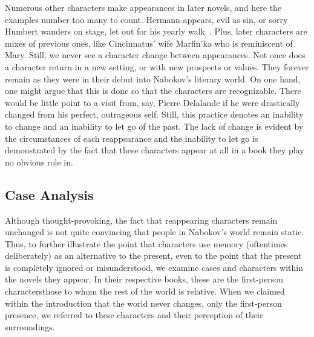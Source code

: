 Numerous other characters make appearances in later novels, and here the examples number too many to count. 
Hermann appears, evil as sin, or sorry Humbert wanders on stage, let out for his yearly walk~\cite[xiii]{nabokov1989despair}.
Plus, later characters are mixes of previous ones, like Cincinnatus' wife Marfin'ka who is reminiscent of Mary.
Still, we never see a character change between appearances. 
Not once does a character return in a new setting, or with new prospects or values.
They forever remain as they were in their debut into Nabokov's literary world.
On one hand, one might argue that this is done so that the characters are recognizable.
There would be little point to a visit from, say, Pierre Delalande if he were drastically changed from his perfect, outrageous self.
Still, this practice denotes an inability to change and an inability to let go of the past. 
The lack of change is evident by the circumstances of each reappearance and the inability to let go is demonstrated by the fact that these characters appear at all in a book they play no obvious role in.

\vspace{1cm}
\subsection{Case Analysis}
Although thought-provoking, the fact that reappearing characters remain unchanged is not quite convincing that people in Nabokov's world remain static.
Thus, to further illustrate the point that characters use memory (oftentimes deliberately) as an alternative to the present, even to the point that the present is completely ignored or misunderstood, we examine cases and characters within the novels they appear.
In their respective books, these are the first-person characters\textemdash those to whom the rest of the world is relative. 
When we claimed within the introduction that the world never changes, only the first-person presence, we referred to these characters and their perception of their surroundings.

\vspace{1cm}

\vspace{1cm}

\vspace{1cm}

\vspace{1cm}


